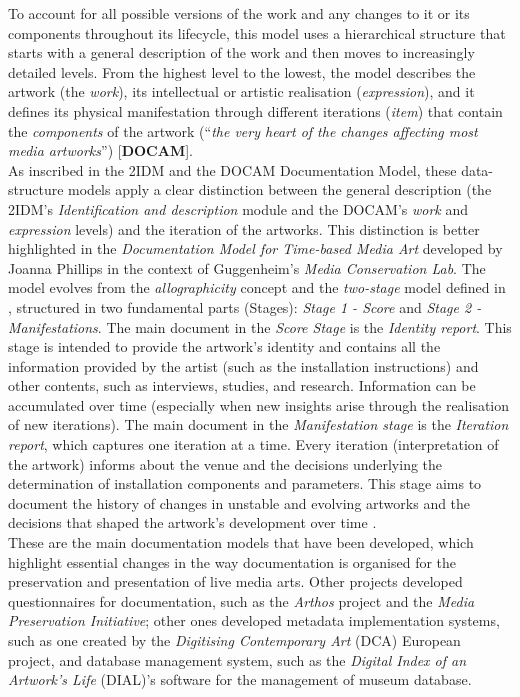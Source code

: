 To account for all possible versions of the work and any changes to it or its components throughout its lifecycle, this model uses a hierarchical structure that starts with a general description of the work and then moves to increasingly detailed levels. From the highest level to the lowest, the model describes the artwork (the \textit{work}), its intellectual or artistic realisation (\textit{expression}), and it defines its physical manifestation through different iterations (\textit{item}) that contain the \textit{components} of the artwork (``\textit{the very heart of the changes affecting most media artworks}'') [\textbf{DOCAM}].\\
As inscribed in the 2IDM and the DOCAM Documentation Model, these data-structure models apply a clear distinction between the general description (the 2IDM’s \textit{Identification and description} module and the DOCAM’s \textit{work} and \textit{expression} levels) and the iteration of the artworks. This distinction is better highlighted in the \textit{Documentation Model for Time-based Media Art} developed by Joanna Phillips in the context of Guggenheim’s \textit{Media Conservation Lab}. The model evolves from the \textit{allographicity} concept and the \textit{two-stage} model defined in \cite{davies2001musical}, structured in two fundamental parts (Stages): \textit{Stage 1 - Score} and \textit{Stage 2 - Manifestations}. The main document in the \textit{Score Stage} is the \textit{Identity report}. This stage is intended to provide the artwork's identity and contains all the information provided by the artist (such as the installation instructions) and other contents, such as interviews, studies, and research. Information can be accumulated over time (especially when new insights arise through the realisation of new iterations). The main document in the \textit{Manifestation stage} is the \textit{Iteration report}, which captures one iteration at a time. Every iteration (interpretation of the artwork) informs about the venue and the decisions underlying the determination of installation components and parameters. This stage aims to document the history of changes in unstable and evolving artworks and the decisions that shaped the artwork's development over time \cite{phillips2015reporting}.\\
These are the main documentation models that have been developed, which highlight essential changes in the way documentation is organised for the preservation and presentation of live media arts. Other projects developed questionnaires for documentation, such as the \textit{Arthos} project and the \textit{Media Preservation Initiative}; other ones developed metadata implementation systems, such as one created by the \textit{Digitising Contemporary Art} (DCA) European project, and database management system, such as the \textit{Digital Index of an Artwork's Life} (DIAL)’s software for the management of museum database.

